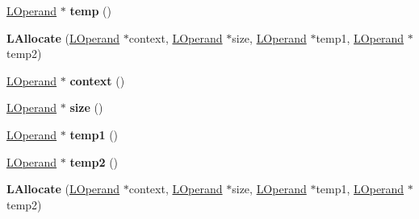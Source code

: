 \begin{DoxyCompactItemize}
\item 
\hyperlink{classv8_1_1internal_1_1_l_operand}{L\+Operand} $\ast$ {\bfseries temp} ()\hypertarget{classv8_1_1internal_1_1_l_allocate_a9067b20a98db902ea392d4bdd3b29fe9}{}\label{classv8_1_1internal_1_1_l_allocate_a9067b20a98db902ea392d4bdd3b29fe9}

\item 
{\bfseries L\+Allocate} (\hyperlink{classv8_1_1internal_1_1_l_operand}{L\+Operand} $\ast$context, \hyperlink{classv8_1_1internal_1_1_l_operand}{L\+Operand} $\ast$size, \hyperlink{classv8_1_1internal_1_1_l_operand}{L\+Operand} $\ast$temp1, \hyperlink{classv8_1_1internal_1_1_l_operand}{L\+Operand} $\ast$temp2)\hypertarget{classv8_1_1internal_1_1_l_allocate_a45d86b0f120cf9be52d2bbd0494683af}{}\label{classv8_1_1internal_1_1_l_allocate_a45d86b0f120cf9be52d2bbd0494683af}

\item 
\hyperlink{classv8_1_1internal_1_1_l_operand}{L\+Operand} $\ast$ {\bfseries context} ()\hypertarget{classv8_1_1internal_1_1_l_allocate_a8e8d6f1d4913d84b1ecf49b67200b7a5}{}\label{classv8_1_1internal_1_1_l_allocate_a8e8d6f1d4913d84b1ecf49b67200b7a5}

\item 
\hyperlink{classv8_1_1internal_1_1_l_operand}{L\+Operand} $\ast$ {\bfseries size} ()\hypertarget{classv8_1_1internal_1_1_l_allocate_a39b42c01160d1f69ebea869bc4b92efe}{}\label{classv8_1_1internal_1_1_l_allocate_a39b42c01160d1f69ebea869bc4b92efe}

\item 
\hyperlink{classv8_1_1internal_1_1_l_operand}{L\+Operand} $\ast$ {\bfseries temp1} ()\hypertarget{classv8_1_1internal_1_1_l_allocate_a61237f94d30caf1437601ac509815068}{}\label{classv8_1_1internal_1_1_l_allocate_a61237f94d30caf1437601ac509815068}

\item 
\hyperlink{classv8_1_1internal_1_1_l_operand}{L\+Operand} $\ast$ {\bfseries temp2} ()\hypertarget{classv8_1_1internal_1_1_l_allocate_ac6d5be0b7ea0bdf9554a0a6921c3a70d}{}\label{classv8_1_1internal_1_1_l_allocate_ac6d5be0b7ea0bdf9554a0a6921c3a70d}

\item 
{\bfseries L\+Allocate} (\hyperlink{classv8_1_1internal_1_1_l_operand}{L\+Operand} $\ast$context, \hyperlink{classv8_1_1internal_1_1_l_operand}{L\+Operand} $\ast$size, \hyperlink{classv8_1_1internal_1_1_l_operand}{L\+Operand} $\ast$temp1, \hyperlink{classv8_1_1internal_1_1_l_operand}{L\+Operand} $\ast$temp2)\hypertarget{classv8_1_1internal_1_1_l_allocate_a45d86b0f120cf9be52d2bbd0494683af}{}\label{classv8_1_1internal_1_1_l_allocate_a45d86b0f120cf9be52d2bbd0494683af}


\end{DoxyCompactItemize}
